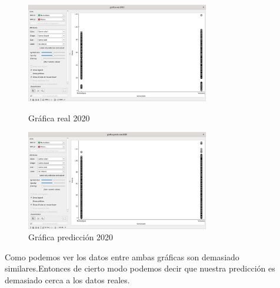 \begin{figure}[htb!]
\begin{minipage}[b]{0.5\linewidth} %
\centering
\includegraphics[width=8cm]{imagenes/grafica-real-2020.png}
    \caption{Gráfica real 2020}
    \label{graficareal}
\end{minipage}
\hspace{0.5cm} %
\begin{minipage}[b]{0.5\linewidth}
\centering
\includegraphics[width=8cm]{imagenes/grafica-prediccion.png}
    \caption{Gráfica predicción 2020}
    \label{graficaprediccion}
\end{minipage}
\end{figure}
\newpage
Como podemos ver los datos entre ambas  gráficas son demasiado similares.Entonces de cierto modo podemos decir que nuestra predicción es demasiado cerca a los datos reales.
